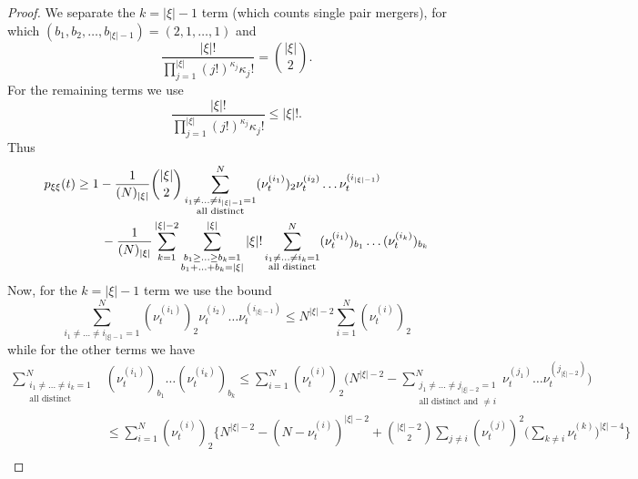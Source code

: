 \begin{proof}
We separate the $k=|\xi|-1$ term (which counts single pair mergers), for which $(b_1, b_2, \dots, b_{|\xi|-1}) = (2,1,\dots,1)$ and
\begin{equation*}
\frac{ | \xi |! }{ \prod_{ j = 1 }^{ | \xi | } ( j ! )^{ \kappa_j } \kappa_j ! }
= \binom{|\xi|}{2} .
\end{equation*}
For the remaining terms we use
\begin{equation*}
\frac{ | \xi |! }{ \prod_{ j = 1 }^{ | \xi | } ( j ! )^{ \kappa_j } \kappa_j ! }
\leq |\xi|! .
\end{equation*}
Thus
\begin{align}
p_{ \xi \xi }( t ) 
&\geq 1 - \frac{ 1 }{ ( N )_{ | \xi | } } \binom{|\xi|}{2}
        \sum_{ \substack{ i_1 \neq \ldots \neq i_{|\xi|-1} = 1 \\ \text{all distinct} } }^N 
        ( \nu_t^{ ( i_1 ) } )_2 \nu_t^{(i_2)} \ldots \nu_t^{ ( i_{|\xi|-1} ) } \notag\\
    &\qquad- \frac{ 1 }{ ( N )_{ | \xi | } } \sum_{ k = 1 }^{ | \xi | - 2 } 
        \sum_{ \substack{ b_1 \geq \ldots \geq b_k = 1 
        \\ b_1 + \ldots + b_k = | \xi | } }^{ | \xi | } |\xi|!
        \sum_{ \substack{ i_1 \neq \ldots \neq i_k = 1 \\ \text{all distinct} } }^N 
        ( \nu_t^{ ( i_1 ) } )_{ b_1 } \ldots ( \nu_t^{ ( i_k ) } )_{ b_k } \label{eq:pDeltaLB_1}
\end{align}
Now, for the $k=|\xi|-1$ term we use the bound
\begin{equation*}
\sum_{ i_1 \neq \ldots \neq i_{ | \xi | - 1 } = 1 }^N 
        ( \nu_t^{ ( i_1 ) } )_2 \nu_t^{ ( i_2 ) } \ldots \nu_t^{ ( i_{ | \xi | - 1 } ) }
\leq N^{ | \xi | - 2 } \sum_{ i = 1 }^N ( \nu_t^{ ( i ) } )_2
\end{equation*}
while for the other terms we have \parencite[similarly to][Lemma 1 Case 3]{koskela2018}
\begin{align*}
\sum_{ \substack{ i_1 \neq \ldots \neq i_k = 1 \\ \text{all distinct} } }^N &( \nu_t^{ ( i_1 ) } )_{ b_1 } \ldots ( \nu_t^{ ( i_k ) } )_{ b_k } \leq \sum_{ i = 1 }^N ( \nu_t^{ ( i ) } )_2 \Bigg( N^{ | \xi | - 2 } - \sum_{ \substack{ j_1 \neq \ldots \neq j_{ | \xi | - 2 } = 1 \\ \text{all distinct and } \neq i } }^N \nu_t^{ ( j_1 ) } \ldots \nu_t^{ ( j_{ | \xi | - 2 } ) } \Bigg) \\
&\leq \sum_{ i = 1 }^N ( \nu_t^{ ( i ) } )_2 \Bigg\{ N^{ | \xi | - 2 } - ( N - \nu_t^{ ( i ) } )^{ | \xi | - 2 } + \binom{ | \xi | - 2 }{ 2 } \sum_{ j \neq i } ( \nu_t^{ ( j ) } )^2 \Bigg( \sum_{ k \neq i } \nu_t^{ ( k ) } \Bigg)^{ | \xi | - 4 } \Bigg\} \\

\end{align*}
\end{proof}
